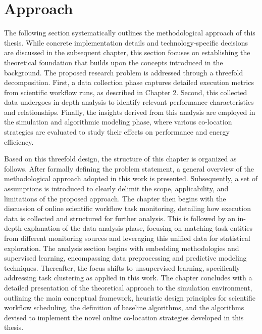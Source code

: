 \section{Approach}
\label{cha:approach}
The following section systematically outlines the methodological approach of this thesis. While concrete implementation details and technology-specific decisions are discussed in the subsequent chapter, this section focuses on establishing the theoretical foundation that builds upon the concepts introduced in the background. The proposed research problem is addressed through a threefold decomposition. First, a data collection phase captures detailed execution metrics from scientific workflow runs, as described in Chapter 2. Second, this collected data undergoes in-depth analysis to identify relevant performance characteristics and relationships. Finally, the insights derived from this analysis are employed in the simulation and algorithmic modeling phase, where various co-location strategies are evaluated to study their effects on performance and energy efficiency.

Based on this threefold design, the structure of this chapter is organized as follows. After formally defining the problem statement, a general overview of the methodological approach adopted in this work is presented. Subsequently, a set of assumptions is introduced to clearly delimit the scope, applicability, and limitations of the proposed approach. The chapter then begins with the discussion of online scientific workflow task monitoring, detailing how execution data is collected and structured for further analysis. This is followed by an in-depth explanation of the data analysis phase, focusing on matching task entities from different monitoring sources and leveraging this unified data for statistical exploration. The analysis section begins with embedding methodologies and supervised learning, encompassing data preprocessing and predictive modeling techniques. Thereafter, the focus shifts to unsupervised learning, specifically addressing task clustering as applied in this work. The chapter concludes with a detailed presentation of the theoretical approach to the simulation environment, outlining the main conceptual framework, heuristic design principles for scientific workflow scheduling, the definition of baseline algorithms, and the algorithms devised to implement the novel online co-location strategies developed in this thesis.

